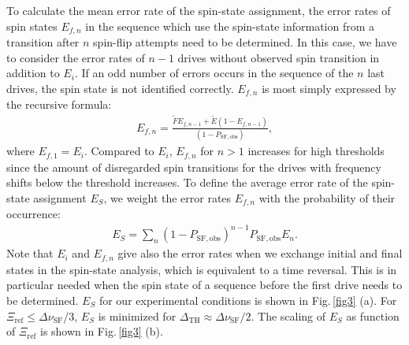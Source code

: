 \documentclass[preprint%
]{elsarticle}
\begin{document}
To calculate the mean error rate of the spin-state assignment, the error rates of spin states $E_{f,n}$ in the sequence which use the spin-state information from a transition after $n$ spin-flip attempts need to be determined. In this case, we have to consider the error rates of $n-1$ drives without observed spin transition in addition to $E_{i}$. If an odd number of errors occurs in the sequence of the $n$ last drives, the spin state is not identified correctly. $E_{f,n}$ is most simply expressed by the recursive formula:
\begin{eqnarray}
E_{f,n} = \frac{\tilde{F} E_{f,n-1} + \tilde{E} (1-E_{f,n-1})}{(1- P_{\mathrm{SF,obs}})},
\end{eqnarray}
where $E_{f,1}=E_{i}$. Compared to $E_{i}$, $E_{f,n}$ for $n>1$ increases for high thresholds since the amount of disregarded spin transitions for the drives with frequency shifts below the threshold increases. To define the average error rate of the spin-state assignment $E_S$, we weight the error rates $E_{f,n}$ with the probability of their occurrence:
\begin{eqnarray}
E_S = \sum_n (1 - P_{\mathrm{SF,obs}})^{n-1} P_{\mathrm{SF,obs}} E_n.
\end{eqnarray}
Note that $E_i$ and $E_{f,n}$ give also the error rates when we exchange initial and final states in the spin-state analysis, which is equivalent to a time reversal. This is in particular needed when the spin state of a sequence before the first drive needs to be determined. $E_S$ for our experimental conditions is shown in Fig.$\,$\ref{fig3} (a). For $\Xi_{\mathrm{ref}} \leq \Delta\nu_{\mathrm{SF}}$/3, $E_S$ is minimized for $\Delta_{\mathrm{TH}} \approx \Delta\nu_\mathrm{SF}/2$. The scaling of $E_S$ as function of $\Xi_{\mathrm{ref}}$ is shown in Fig.$\,$\ref{fig3} (b).
\end{document}
